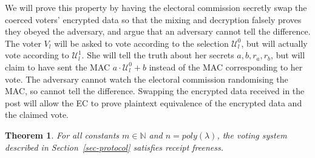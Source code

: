 \documentclass[12pt,a4paper]{article}
\newtheorem{theorem}{Theorem}
\theoremstyle{definition}
\newcounter{protocol}
\begin{document}
We will prove this property by having the electoral commission secretly swap the coerced voters' encrypted data so that the mixing and decryption falsely proves they obeyed the adversary, and argue that an adversary cannot tell the difference. The voter $V_l$ will be asked to vote according to the selection $\mathcal{U}^0_l$, but will actually vote according to $\mathcal{U}^1_l$. She will tell the truth about her secrets $a, b, r_a, r_b$, but will claim to have sent the MAC $a\cdot\mathcal{U}^0_l+b$ instead of the MAC corresponding to her vote. The adversary cannot watch the electoral commission randomising the MAC, so cannot tell the difference. Swapping the encrypted data received in the post will allow the EC to prove plaintext equivalence of the encrypted data and the claimed vote.
\begin{theorem}\label{thm-Rec-free}
    For all constants $m \in \mathbb{N}$ and $n=poly(\lambda)$, the voting system described in Section~\ref{sec-protocol} satisfies receipt freeness.
\end{theorem}
\end{document}
